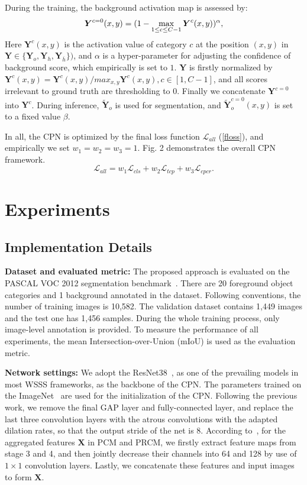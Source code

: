 \documentclass[10pt,twocolumn,letterpaper]{article}
\begin{document}
During the training, the background activation map is assessed by:
\begin{equation}\label{bg}
 \boldsymbol{Y}^{c=0}(x,y) = {(1 - \mathop {\max }\limits_{1 \le {\rm{c}} \le C - 1} {\boldsymbol{Y}^{c}}(x,y))^\alpha },
\end{equation}
Here ${ \boldsymbol{Y}^{c}}(x,y)$ is the activation value of category $c$ at the position $(x,y)$ in $ \boldsymbol{Y} \in \{ \boldsymbol{Y}_o,  \boldsymbol{Y}_h,  \boldsymbol{Y}_{\overline h}\})$, and $\alpha$ is a hyper-parameter for adjusting the confidence of background score, which empirically is set to $1$. $ \boldsymbol{Y}$ is firstly normalized by $ \boldsymbol{Y}^c(x,y) =  \boldsymbol{Y}^c(x,y) / max_{x,y}  \boldsymbol{Y}^c(x,y),c \in[1,C-1]$, and all scores irrelevant to ground truth are thresholding to $0$. Finally we concatenate $ \boldsymbol{Y}^{c=0}$ into $ \boldsymbol{Y}^{c}$. During inference, $\widetilde { \boldsymbol{Y}}_{o}$ is used for segmentation, and $\widetilde{ \boldsymbol{Y}}_{o}^{c=0}(x,y)$ is set to a fixed value $\beta$.

In all, the CPN is optimized by the final loss function $\mathcal {L}_{all}$ (\ref{floss}), and empirically we set $w_1=w_2=w_3=1$. Fig. 2 demonstrates the overall CPN framework.
\begin{equation}\label{floss}
\mathcal {L}_{all} =w_1\mathcal {L}_{cls} + w_2\mathcal {L}_{tcp}  + w_3\mathcal {L}_{cpcr}.
\end{equation}
\section{Experiments}
\subsection{Implementation Details}
\noindent\textbf{Dataset and evaluated metric:}\; The proposed approach is evaluated on the PASCAL VOC 2012 segmentation benchmark~\cite{voc12}. There are 20 foreground object categories and 1 background annotated in the dataset. Following conventions, the number of training images is 10,582. The validation dataset contains 1,449 images and the test one has 1,456 samples. During the whole training process, only image-level annotation is provided. To measure the performance of all experiments, the mean Intersection-over-Union (mIoU) is used as the evaluation metric.

\noindent\textbf{Network settings:}\; We adopt the ResNet38~\cite{resnet38}, as one of the prevailing models in most WSSS frameworks, as the backbone of the CPN. The parameters trained on the ImageNet~\cite{imagenet} are used for the initialization of the CPN. Following the previous work, we remove the final GAP layer and fully-connected layer, and replace the last three convolution layers with the atrous convolutions with the adapted dilation rates, so that the output stride of the net is 8. According to~\cite{seam}, for the aggregated features $\boldsymbol{X}$ in PCM and PRCM, we firstly extract feature maps from stage 3 and 4, and then jointly decrease their channels into 64 and 128 by use of $1\times1$ convolution layers. Lastly, we concatenate these features and input images to form $\boldsymbol{X}$.
\end{document}
